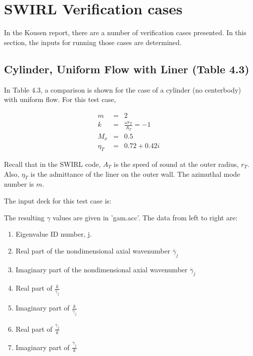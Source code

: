 \section{SWIRL Verification cases}

In the Kousen report, there are a number of verification
cases presented.  In this section, the inputs for running
those cases are determined.

\subsection{Cylinder, Uniform Flow with Liner (Table 4.3)}

In Table 4.3, a comparison is shown for the case of a 
cylinder (no centerbody) with uniform flow.  For this
test case, 

\begin{eqnarray}
m &=& 2
\nonumber
\\
k &=& \frac{\omega r_T}{A_T} = -1
\nonumber
\\
M_x &=& 0.5
\nonumber
\\
\eta_T &=& 0.72 + 0.42 i
\nonumber
\end{eqnarray}

Recall that in the SWIRL code, $A_T$ is the speed of
sound at the outer radius, $r_T$.  Also, $\eta_T$ is the 
admittance of the liner on the outer wall.  The azimuthal
mode number is $m$.

The input deck for this test case is:

\begin{tiny}
\end{tiny}%

The resulting $\gamma$ values are given in 'gam.acc'.  The
data from left to right are:

\begin{enumerate}
\item{Eigenvalue ID number, j.}
\item{Real part of the nondimensional axial wavenumber $\overline{\gamma}_j$}
\item{Imaginary part of the nondimensional axial wavenumber $\overline{\gamma}_j$}
\item{Real part of $\frac{k}{\overline{\gamma}_j}$}
\item{Imaginary part of $\frac{k}{\overline{\gamma}_j}$}
\item{Real part of $\frac{\overline{\gamma}_j}{k}$}
\item{Imaginary part of $\frac{\overline{\gamma}_j}{k}$}
\end{enumerate}

